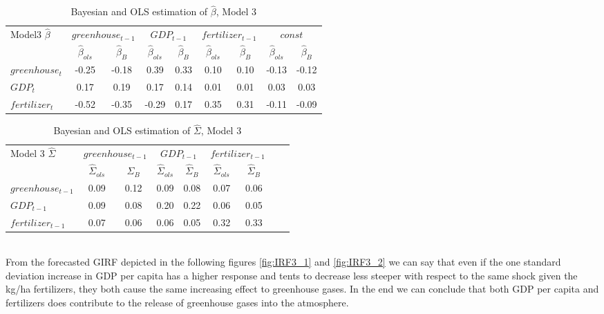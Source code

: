 \documentclass[12pt]{article}
\begin{document}
\begin{table}[H]
\centering
\label{tab:tab_beta_3}
\begin{tabular}{|l|c|c|c|c|c|c|c|c|}
  \hline
 \multirow{2}{*}{Model3 $\hat{\beta}$} & \multicolumn{2}{c|}{$greenhouse_{t-1}$} & \multicolumn{2}{c|}{$GDP_{t-1}$}  & \multicolumn{2}{c|}{$fertilizer_{t-1}$} & \multicolumn{2}{c|}{$const$} \\  \cline{2-9}
 & $\hat{\beta}_{ols}$ & $\hat{\beta}_{B}$ & $\hat{\beta}_{ols}$ & $\hat{\beta}_{B}$ & $\hat{\beta}_{ols}$ & $\hat{\beta}_{B}$ & $\hat{\beta}_{ols}$ & $\hat{\beta}_{B}$\\
  \hline
    $greenhouse_{t}$ & -0.25 & -0.18 & 0.39 & 0.33 & 0.10  &  0.10 &  -0.13  & -0.12 \\ 
    $GDP_{t}$ & 0.17 & 0.19 & 0.17 &  0.14 & 0.01 & 0.01 & 0.03 & 0.03\\ 
    $fertilizer_{t}$ & -0.52 & -0.35 & -0.29 & 0.17 & 0.35 & 0.31 & -0.11 & -0.09 \\ 
   \hline
\end{tabular}
\caption{Bayesian and OLS estimation of $\hat{\beta}$, Model 3} \label{tab:tab_beta_3}
\end{table}

\begin{table}[H]
\centering
\begin{tabular}{|l|c|c|c|c|c|c|c|c|}
  \hline
 \multirow{2}{*}{Model 3 $\hat{\Sigma}$} & \multicolumn{2}{c|}{$greenhouse_{t-1}$} & \multicolumn{2}{c|}{$GDP_{t-1}$} & \multicolumn{2}{c|}{$fertilizer_{t-1}$} \\  \cline{2-7}
 & $\hat{\Sigma}_{ols}$ & $\hat{\Sigma}_{B}$ & $\hat{\Sigma}_{ols}$ & $\hat{\Sigma}_{B}$ & $\hat{\Sigma}_{ols}$ & $\hat{\Sigma}_{B}$ \\
  \hline
    $greenhouse_{t-1}$ & 0.09 & 0.12 & 0.09 & 0.08 & 0.07  &  0.06   \\ 
    $GDP_{t-1}$ & 0.09 & 0.08 & 0.20 &  0.22 & 0.06 & 0.05 \\ 
    $fertilizer_{t-1}$ & 0.07 & 0.06 & 0.06 & 0.05 & 0.32 & 0.33 \\ 
   \hline
\end{tabular}
\caption{Bayesian and OLS estimation of $\hat{\Sigma}$, Model 3} \label{tab:tab_sigma_3}
\end{table}
\\


From the forecasted GIRF depicted in the following figures \ref{fig:IRF3_1} and \ref{fig:IRF3_2} we can say that even if the one standard deviation increase in GDP per capita has a higher response and tents to decrease less steeper with respect to the same shock given the kg/ha fertilizers, they both cause the same increasing effect to greenhouse gases. In the end we can conclude that both GDP per capita and fertilizers does contribute to the release of greenhouse gases into the atmosphere.
\end{document}
